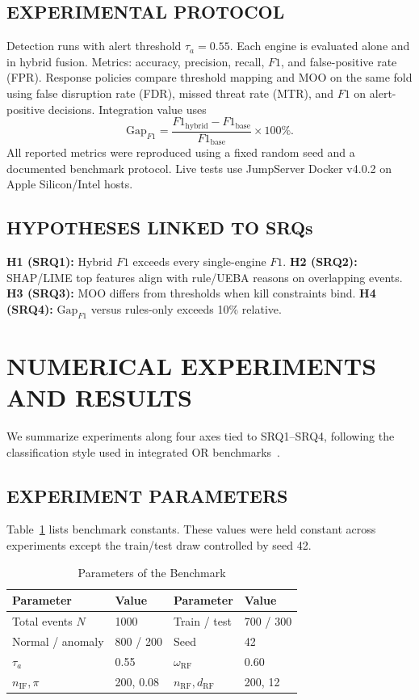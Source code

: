 \documentclass{ieeeaccess}
\begin{document}
\subsection{EXPERIMENTAL PROTOCOL}
Detection runs with alert threshold $\tau_a=0.55$. Each engine is evaluated alone and in hybrid fusion. Metrics: accuracy, precision, recall, $F1$, and false-positive rate (FPR). Response policies compare threshold mapping and MOO on the same fold using false disruption rate (FDR), missed threat rate (MTR), and $F1$ on alert-positive decisions. Integration value uses
\begin{equation}
\mathrm{Gap}_{F1}=\frac{F1_{\mathrm{hybrid}}-F1_{\mathrm{base}}}{F1_{\mathrm{base}}}\times 100\%.
\label{eq:gap}
\end{equation}
All reported metrics were reproduced using a fixed random seed and a documented benchmark protocol. Live tests use JumpServer Docker v4.0.2 on Apple Silicon/Intel hosts.

\subsection{HYPOTHESES LINKED TO SRQs}
\textbf{H1 (SRQ1):} Hybrid $F1$ exceeds every single-engine $F1$. \textbf{H2 (SRQ2):} SHAP/LIME top features align with rule/UEBA reasons on overlapping events. \textbf{H3 (SRQ3):} MOO differs from thresholds when kill constraints bind. \textbf{H4 (SRQ4):} $\mathrm{Gap}_{F1}$ versus rules-only exceeds 10\% relative.

\section{NUMERICAL EXPERIMENTS AND RESULTS}
\label{sec:experiments}

We summarize experiments along four axes tied to SRQ1--SRQ4, following the classification style used in integrated OR benchmarks~\cite{ref14}.

\subsection{EXPERIMENT PARAMETERS}
Table~\ref{tab:exp-params} lists benchmark constants. These values were held constant across experiments except the train/test draw controlled by seed 42.

\begin{table}[!t]
\caption{Parameters of the Benchmark}
\label{tab:exp-params}
\centering
\scriptsize
\begin{tabular}{@{}ll|ll@{}}
\toprule
\textbf{Parameter} & \textbf{Value} & \textbf{Parameter} & \textbf{Value} \\
\midrule
Total events $N$ & 1000 & Train / test & 700 / 300 \\
Normal / anomaly & 800 / 200 & Seed & 42 \\
$\tau_a$ & 0.55 & $\omega_{\mathrm{RF}}$ & 0.60 \\
$n_{\mathrm{IF}},\pi$ & 200, 0.08 & $n_{\mathrm{RF}},d_{\mathrm{RF}}$ & 200, 12 \\
\bottomrule
\end{tabular}
\end{table}
\end{document}
